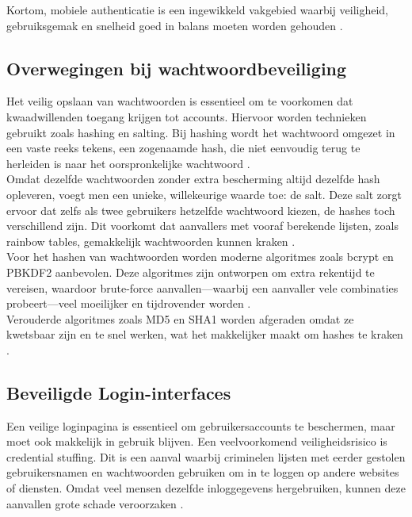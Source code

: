 Kortom, mobiele authenticatie is een ingewikkeld vakgebied waarbij veiligheid, gebruiksgemak en snelheid goed in balans moeten worden gehouden \autocite{Zukarnain2022, Gao2023}.\\


\subsection{Overwegingen bij wachtwoordbeveiliging}
Het veilig opslaan van wachtwoorden is essentieel om te voorkomen dat kwaadwillenden toegang krijgen tot accounts. Hiervoor worden technieken gebruikt zoals hashing en salting. Bij hashing wordt het wachtwoord omgezet in een vaste reeks tekens, een zogenaamde hash, die niet eenvoudig terug te herleiden is naar het oorspronkelijke wachtwoord \autocite{Gupta2022}.\\

Omdat dezelfde wachtwoorden zonder extra bescherming altijd dezelfde hash opleveren, voegt men een unieke, willekeurige waarde toe: de salt. Deze salt zorgt ervoor dat zelfs als twee gebruikers hetzelfde wachtwoord kiezen, de hashes toch verschillend zijn. Dit voorkomt dat aanvallers met vooraf berekende lijsten, zoals rainbow tables, gemakkelijk wachtwoorden kunnen kraken \autocite{Arias2025}.\\

Voor het hashen van wachtwoorden worden moderne algoritmes zoals bcrypt en PBKDF2 aanbevolen. Deze algoritmes zijn ontworpen om extra rekentijd te vereisen, waardoor brute-force aanvallen—waarbij een aanvaller vele combinaties probeert—veel moeilijker en tijdrovender worden \autocite{Gupta2022}.\\

Verouderde algoritmes zoals MD5 en SHA1 worden afgeraden omdat ze kwetsbaar zijn en te snel werken, wat het makkelijker maakt om hashes te kraken \autocite{ReesCarter2024}.

\subsection{Beveiligde Login-interfaces}
Een veilige loginpagina is essentieel om gebruikersaccounts te beschermen, maar moet ook makkelijk in gebruik blijven. Een veelvoorkomend veiligheidsrisico is credential stuffing. Dit is een aanval waarbij criminelen lijsten met eerder gestolen gebruikersnamen en wachtwoorden gebruiken om in te loggen op andere websites of diensten. Omdat veel mensen dezelfde inloggegevens hergebruiken, kunnen deze aanvallen grote schade veroorzaken \autocite{Chinnasamy2025}.\\

